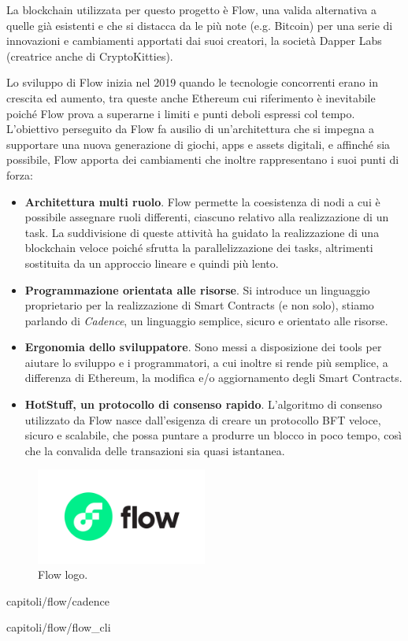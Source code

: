 La blockchain utilizzata per questo progetto è Flow, una valida alternativa a quelle già esistenti e che si distacca da le più note (e.g. Bitcoin) per una serie di innovazioni e cambiamenti apportati dai suoi creatori, la società Dapper Labs (creatrice anche di CryptoKitties). 

Lo sviluppo di Flow inizia nel 2019 quando le tecnologie concorrenti erano in crescita ed aumento, tra queste anche Ethereum cui riferimento è inevitabile poiché Flow prova a superarne i limiti e punti deboli espressi col tempo. L'obiettivo perseguito da Flow fa ausilio di un'architettura che si impegna a supportare una nuova generazione di giochi, apps e assets digitali, e affinché sia possibile, Flow apporta dei cambiamenti che inoltre rappresentano i suoi punti di forza: 

\begin{itemize}
    \item \textbf{Architettura multi ruolo}. Flow permette la coesistenza di nodi a cui è possibile assegnare ruoli differenti, ciascuno relativo alla realizzazione di un task. La suddivisione di queste attività ha guidato la realizzazione di una blockchain veloce poiché sfrutta la parallelizzazione dei tasks, altrimenti sostituita da un approccio lineare e quindi più lento.
    \item \textbf{Programmazione orientata alle risorse}. Si introduce un linguaggio proprietario per la realizzazione di Smart Contracts (e non solo), stiamo parlando di \textit{Cadence}, un linguaggio semplice, sicuro e orientato alle risorse.
    \item \textbf{Ergonomia dello sviluppatore}. Sono messi a disposizione dei tools per aiutare lo sviluppo e i programmatori, a cui inoltre si rende più semplice, a differenza di Ethereum, la modifica e/o aggiornamento degli Smart Contracts.
    \item \textbf{HotStuff, un protocollo di consenso rapido}. L'algoritmo di consenso utilizzato da Flow nasce dall'esigenza di creare un protocollo BFT veloce, sicuro e scalabile, che possa puntare a produrre un blocco in poco tempo, così che la convalida delle transazioni sia quasi istantanea.
\end{itemize}

\begin{figure}[h]
    \centering
    \includegraphics[width=0.5\textwidth]{img/FLOW-logo.png}
    \caption{Flow logo.}
    \label{fig:flow_logo}
\end{figure}


{capitoli/flow/cadence}

{capitoli/flow/flow_cli}